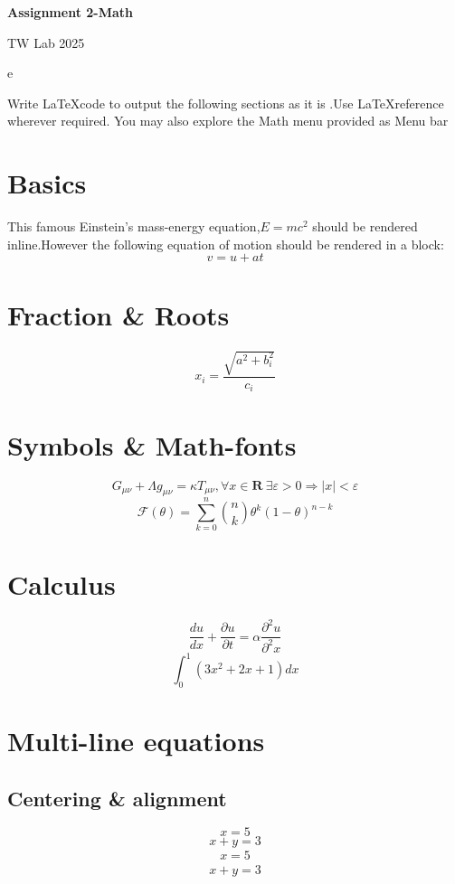\documentclass[18]{article}
\begin{document}
\begin{center}
\Large\textbf{Assignment 2-Math}
\end{center}
\begin{center}
\large{TW Lab 2025}
\end{center}
\vspace{1cm}e
\begin{center}
Write \LaTeX code to output the following sections as it is .Use \LaTeX reference wherever required. You may also explore the Math menu provided as Menu bar
\end{center}
\section{Basics}
This famous Einstein's mass-energy equation,$E=mc^2$ should be rendered inline.However the following equation of motion should be rendered in a block:
\[
v = u + at
\]

\section{Fraction \& Roots}
\[
x_i={\frac{\sqrt{a^2+b_i^2}}{c_i}}
\]

\section{Symbols \& Math-fonts}
\[
G_{\mu\nu}+\Lambda g_{\mu\nu}=\kappa T_{\mu\nu},   \forall x \in \mathbf{R} \ \exists \varepsilon > 0 \Rightarrow |x| < \varepsilon
\]
\[
\mathcal{F}(\theta)=\sum_{k=0}^{n}{n \choose k} \theta^k (1-\theta)^{n-k}
\]

\section{Calculus}
\[
\frac{du}{dx}+\frac{\partial u}{\partial t}=\alpha \frac{\partial^2 u}{\partial^2 x}
\]
\[
\int_{0}^{1}(3x^2 + 2x+1)dx
\]
\vspace{4cm}
\section{Multi-line equations}
\subsection{Centering \& alignment}
\begin{equation}
x=5
\end{equation}
\begin{equation}
x+y=3
\end{equation}
\vspace{1cm}
\begin{align}
x=5
\end{align}
\begin{align}
x+y=3
\end{align}
\end{document}
